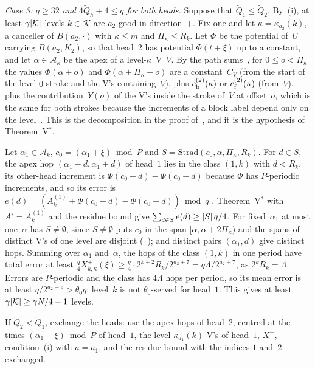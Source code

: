 \begin{outline}
\emph{Case 3: $q\ge32$ and $4\tilde Q_h+4\le q$ for both heads.} Suppose that $\tilde Q_1\le\tilde Q_2$. By~(i), at
least $\gamma\lvert \mathcal K \rvert$ levels $k\in\mathcal K$ are $a_2$-good in direction~$+$. Fix one and let
$\kappa=\kappa_{a_2}(k)$, a canceller of $B(a_2,\cdot)$ with $\kappa\le m$ and $\Pi_\kappa\le R_k$. Let $\Phi$ be the
potential of~$U$ carrying $B(a_2,K_2)$, so that head~$2$ has potential $\Phi(t+\xi)$ up to a constant, and let
$\alpha\in\mathcal A_\kappa$ be the apex of a level-$\kappa$~V~$V$. By the path sums~\cite[Lemma~5.9]{BoundedNesting2026},
for $0\le o<\Pi_\kappa$ the values $\Phi(\alpha+o)$ and $\Phi(\alpha+\Pi_\kappa+o)$ are a constant~$C_V$ (from the start of
the level-$0$ stroke and the V's containing~$V$), plus $c^{(2)}_{\mathrm{b}}(\kappa)$ or $c^{(2)}_{\mathrm{f}}(\kappa)$ (from~$V$), plus the contribution~$Y(o)$ of the V's
inside the stroke of~$V$ at offset~$o$, which is the same for both strokes because the increments of a block label depend
only on the level~\cite[Lemma~5.12]{BoundedNesting2026}. This is the decomposition in the proof
of~\cite[Lemma~5.20]{BoundedNesting2026}, and it is the hypothesis of Theorem~V$^*$.

Let $\alpha_1\in\mathcal A_k$, $c_0=(\alpha_1+\xi)\bmod P$ and $S=\mathrm{Strad}(c_0,\alpha,\Pi_\kappa,R_k)$. For $d\in S$,
the apex hop $(\alpha_1-d,\alpha_1+d)$ of head~$1$ lies in the class $(1,k)$ with $d<R_k$, its other-head increment is
$\Phi(c_0+d)-\Phi(c_0-d)$ because $\Phi$ has $P$-periodic increments, and so its error is
$e(d)=(A^{(1)}_k+\Phi(c_0+d)-\Phi(c_0-d))\bmod q$ \cite[Lemma~5.10(a)]{BoundedNesting2026}. Theorem~V$^*$ with
$A'=A^{(1)}_k$ and the residue bound give $\sum_{d\in S}e(d)\ge\lvert S \rvert\,q/4$. For fixed~$\alpha_1$ at most one~$\alpha$ has
$S\ne\emptyset$, since $S\ne\emptyset$ puts $c_0$ in the span $[\alpha,\alpha+2\Pi_\kappa)$ and the spans of distinct V's of
one level are disjoint (~\cite{DirectedReciprocity2026}); and distinct pairs
$(\alpha_1,d)$ give distinct hops. Summing over $\alpha_1$ and~$\alpha$, the hops of the class $(1,k)$ in one period have
total error at least $\frac q4X^+_{k,\kappa}(\xi)\ge\frac q4\cdot2^{k+2}R_k/2^{a_2+7}=q\Lambda/2^{a_2+7}$, as
$2^kR_k=\Lambda$. Errors are $P$-periodic and the class has $4\Lambda$ hops per period, so its mean error is at least
$q/2^{a_2+9}>\theta_0q$: level~$k$ is not $\theta_0$-served for head~$1$. This gives at least
$\gamma\lvert \mathcal K \rvert\ge\gamma N/4-1$ levels.

If $\tilde Q_2<\tilde Q_1$, exchange the heads: use the apex hops of head~$2$, centred at the times
$(\alpha_1-\xi)\bmod P$ of head~$1$, the level-$\kappa_{a_1}(k)$ V's of head~$1$, $X^-$, condition~(i) with $a=a_1$, and
the residue bound with the indices $1$ and~$2$ exchanged.


\end{outline}
